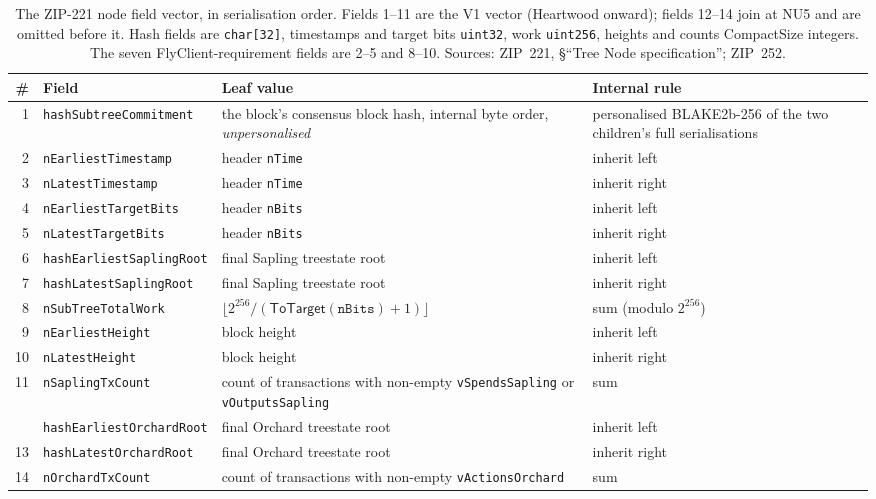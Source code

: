 \documentclass[11pt,a4paper]{article}
\theoremstyle{definition}
\begin{document}
\begin{table}[htbp]
\centering
\footnotesize
\begin{tabular}{@{}rlp{4.3cm}p{4.2cm}@{}}
\toprule
\# & Field & Leaf value & Internal rule \\
\midrule
1 & \texttt{hashSubtreeCommitment} & the block's consensus block hash,
internal byte order, \emph{unpersonalised} & personalised
BLAKE2b-256 of the two children's full serialisations \\
2 & \texttt{nEarliestTimestamp} & header \texttt{nTime} & inherit left \\
3 & \texttt{nLatestTimestamp} & header \texttt{nTime} & inherit right \\
4 & \texttt{nEarliestTargetBits} & header \texttt{nBits} & inherit left \\
5 & \texttt{nLatestTargetBits} & header \texttt{nBits} & inherit right \\
6 & \texttt{hashEarliestSaplingRoot} & final Sapling treestate root &
inherit left \\
7 & \texttt{hashLatestSaplingRoot} & final Sapling treestate root &
inherit right \\
8 & \texttt{nSubTreeTotalWork} & $\lfloor 2^{256} /
(\mathsf{ToTarget}(\mathtt{nBits}) + 1) \rfloor$ & sum (modulo
$2^{256}$) \\
9 & \texttt{nEarliestHeight} & block height & inherit left \\
10 & \texttt{nLatestHeight} & block height & inherit right \\
11 & \texttt{nSaplingTxCount} & count of transactions with non-empty
\texttt{vSpendsSapling} or \texttt{vOutputsSapling} & sum \\
\addlinespace
12 & \texttt{hashEarliestOrchardRoot} & final Orchard treestate root &
inherit left \\
13 & \texttt{hashLatestOrchardRoot} & final Orchard treestate root &
inherit right \\
14 & \texttt{nOrchardTxCount} & count of transactions with non-empty
\texttt{vActionsOrchard} & sum \\
\bottomrule
\end{tabular}
\caption{The ZIP-221 node field vector, in serialisation order. Fields
1--11 are the V1 vector (Heartwood onward); fields 12--14 join at NU5 and
are omitted before it. Hash fields are \texttt{char[32]}, timestamps and
target bits \texttt{uint32}, work \texttt{uint256}, heights and counts
CompactSize integers. The seven FlyClient-requirement fields are 2--5 and
8--10. Sources: ZIP~221, \S``Tree Node specification''; ZIP~252.}
\label{tab:fc-fields}
\end{table}
\end{document}

